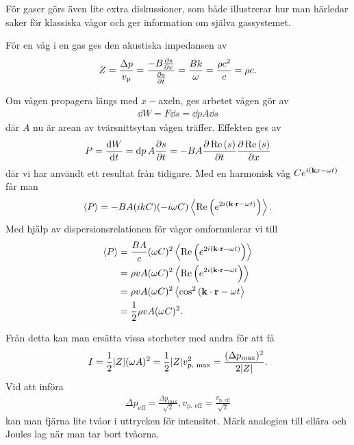 För gaser görs även lite extra diskussioner, som både illustrerar hur man härledar saker för klassiska vågor och ger information om själva gassystemet.

För en våg i en gas ges den akustiska impedansen av
\begin{align*}
	Z = \frac{\Delta p}{v_{\text{p}}} = \frac{-B\pdv{s}{x}}{\pdv{s}{t}} = \frac{Bk}{\omega} = \frac{\rho c^2}{c} = \rho c.
\end{align*}

Om vågen propagera längs med $x-$axeln, ges arbetet vågen gör av
\begin{align*}
	\dd{W} = F\dd{s} = \dd{p}A\dd{s}
\end{align*}
där $A$ nu är arean av tvärsnittsytan vågen träffer. Effekten ges av
\begin{align*}
	P = \dv{W}{t} = \dd{p}A\pdv{s}{t} = -BA\pdv{\operatorname{Re}\left(s\right)}{t}\pdv{\operatorname{Re}\left(s\right)}{x}
\end{align*}
där vi har användt ett resultat från tidigare. Med en harmonisk våg $Ce^{i(\vect{k}x - \omega t)}$ får man
\begin{align*}
	\expval{P} = -BA(ikC)(-i\omega C)\expval{\Re{e^{2i(\vect{k}\cdot\vect{r} - \omega t)}}}.
\end{align*}
Med hjälp av dispersionsrelationen för vågor omformulerar vi till
\begin{align*}
	\expval{P} &= \frac{BA}{c}(\omega C)^2\expval{\Re{e^{2i(\vect{k}\cdot\vect{r} - \omega t)}}} \\
	           &= \rho vA(\omega C)^2\expval{\Re{e^{2i(\vect{k}\cdot\vect{r} - \omega t}}} \\
	           &= \rho vA(\omega C)^2\expval{\cos^2{(\vect{k}\cdot\vect{r} - \omega t}} \\
	           &= \frac{1}{2}\rho vA(\omega C)^2.
\end{align*}

Från detta kan man ersätta vissa storheter med andra för att få
\begin{align*}
	I = \frac{1}{2}\abs{Z}(\omega A)^2 = \frac{1}{2}\abs{Z}v_{\text{p, max}}^2 = \frac{(\Delta p_{\text{max}})^2}{2\abs{Z}}.
\end{align*}
Vid att införa
\begin{align*}
	\Delta p_{\text{eff}} = \frac{\Delta p_{\text{max}}}{\sqrt{2}}, v_{\text{p, eff}} = \frac{v_{\text{p, eff}}}{\sqrt{2}}
\end{align*}
kan man fjärna lite tvåor i uttrycken för intensitet. Märk analogien till ellära och Joules lag när man tar bort tvåorna.

